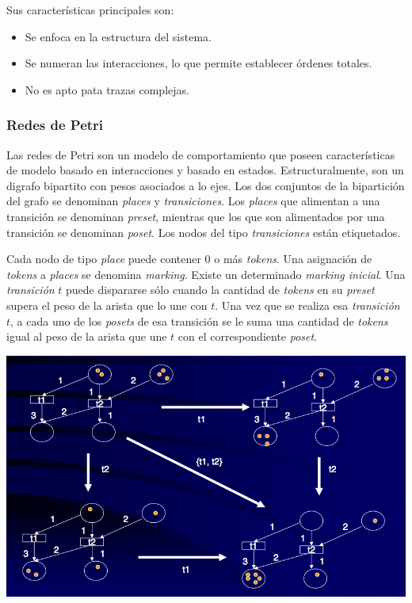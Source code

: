 \documentclass[]{article}
\begin{document}
Sus características principales son:
\begin{itemize}
	\item Se enfoca en la estructura del sistema.
	\item Se numeran las interacciones, lo que permite establecer órdenes totales.
	\item No es apto pata trazas complejas.
\end{itemize}

\subsubsection{Redes de Petri}
Las redes de Petri son un modelo de comportamiento que poseen características de modelo basado en interacciones y basado en estados. Estructuralmente, son un digrafo bipartito con pesos asociados a lo ejes. Los dos conjuntos de la bipartición del grafo se denominan \textit{places} y \textit{transiciones}. Los \textit{places} que alimentan a una transición se denominan \textit{preset}, mientras que los que son alimentados por una transición se denominan \textit{poset}. Los nodos del tipo \textit{transiciones} están etiquetados.

Cada nodo de tipo \textit{place} puede contener 0 o más \textit{tokens}. Una asignación de \textit{tokens} a \textit{places} se denomina \textit{marking}. Existe un determinado \textit{marking inicial}. Una \textit{transición} $t$ puede dispararse sólo cuando la cantidad de \textit{tokens} en su \textit{preset} supera el peso de la arista que lo une con $t$. Una vez que se realiza esa \textit{transición} $t$, a cada uno de los \textit{posets} de esa transición se le suma una cantidad de \textit{tokens} igual al peso de la arista que une $t$ con el correspondiente \textit{poset}.

\begin{center}
	\includegraphics[scale=0.5]{Petri.png}
\end{center}
\end{document}
